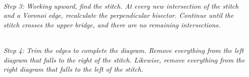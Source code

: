 \documentclass[12pt]{article}
\begin{document}
\begin{center}
     \\ {\em
    Step 3: Working upward, find the stitch.  At every new intersection of
    the stitch and a Voronoi edge, recalculate the perpendicular
    bisector.  Continue until the stitch crosses the upper bridge, and
    there are no remaining intersections. }
    \vfill

     \\
    {\em Step 4: Trim the edges to complete the diagram.  Remove
    everything from the left diagram that falls to the right of the
    stitch.  Likewise, remove everything from the right diagram that falls
    to the left of the stitch. }
    \end{center}

\end{document}

